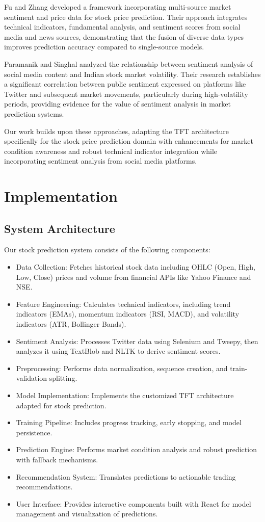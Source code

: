 \documentclass[conference]{IEEEtran}
\begin{document}
Fu and Zhang \cite{fu2024incorporating} developed a framework incorporating multi-source market sentiment and price data for stock price prediction. Their approach integrates technical indicators, fundamental analysis, and sentiment scores from social media and news sources, demonstrating that the fusion of diverse data types improves prediction accuracy compared to single-source models.

Paramanik and Singhal \cite{paramanik2020sentiment} analyzed the relationship between sentiment analysis of social media content and Indian stock market volatility. Their research establishes a significant correlation between public sentiment expressed on platforms like Twitter and subsequent market movements, particularly during high-volatility periods, providing evidence for the value of sentiment analysis in market prediction systems.

Our work builds upon these approaches, adapting the TFT architecture specifically for the stock price prediction domain with enhancements for market condition awareness and robust technical indicator integration while incorporating sentiment analysis from social media platforms.

\section{Implementation}
\subsection{System Architecture}
Our stock prediction system consists of the following components:

\begin{itemize}
\item Data Collection: Fetches historical stock data including OHLC (Open, High, Low, Close) prices and volume from financial APIs like Yahoo Finance and NSE.
\item Feature Engineering: Calculates technical indicators, including trend indicators (EMAs), momentum indicators (RSI, MACD), and volatility indicators (ATR, Bollinger Bands).
\item Sentiment Analysis: Processes Twitter data using Selenium and Tweepy, then analyzes it using TextBlob and NLTK to derive sentiment scores.
\item Preprocessing: Performs data normalization, sequence creation, and train-validation splitting.
\item Model Implementation: Implements the customized TFT architecture adapted for stock prediction.
\item Training Pipeline: Includes progress tracking, early stopping, and model persistence.
\item Prediction Engine: Performs market condition analysis and robust prediction with fallback mechanisms.
\item Recommendation System: Translates predictions to actionable trading recommendations.
\item User Interface: Provides interactive components built with React for model management and visualization of predictions.
\end{itemize}
\end{document}
